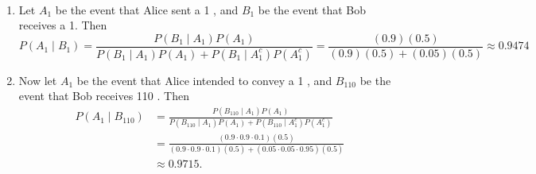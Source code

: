 

\setcounter{theorem}{11}

\begin{exercise}[BH.2.11]
	\begin{solution}~
		\begin{enumerate}
			\item Let $A_1$ be the event that Alice sent a 1 , and $B_1$ be the event that Bob receives a 1. Then
			$$
			P\left(A_1 \mid B_1\right)=\frac{P\left(B_1 \mid A_1\right) P\left(A_1\right)}{P\left(B_1 \mid A_1\right) P\left(A_1\right)+P\left(B_1 \mid A_1^c\right) P\left(A_1^c\right)}=\frac{(0.9)(0.5)}{(0.9)(0.5)+(0.05)(0.5)} \approx 0.9474
			$$
			\item Now let $A_1$ be the event that Alice intended to convey a 1 , and $B_{110}$ be the event that Bob receives 110 . Then
			$$
			\begin{aligned}
				P\left(A_1 \mid B_{110}\right) &=\frac{P\left(B_{110} \mid A_1\right) P\left(A_1\right)}{P\left(B_{110} \mid A_1\right) P\left(A_1\right)+P\left(B_{110} \mid A_1^c\right) P\left(A_1^c\right)} \\
				&=\frac{(0.9 \cdot 0.9 \cdot 0.1)(0.5)}{(0.9 \cdot 0.9 \cdot 0.1)(0.5)+(0.05 \cdot 0.05 \cdot 0.95)(0.5)} \\
				& \approx 0.9715 .
			\end{aligned}
			$$
		\end{enumerate}
	\end{solution}
\end{exercise}



